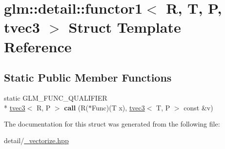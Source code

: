 \hypertarget{structglm_1_1detail_1_1functor1_3_01R_00_01T_00_01P_00_01tvec3_01_4}{\section{glm\-:\-:detail\-:\-:functor1$<$ R, T, P, tvec3 $>$ Struct Template Reference}
\label{structglm_1_1detail_1_1functor1_3_01R_00_01T_00_01P_00_01tvec3_01_4}
}
\subsection*{Static Public Member Functions}
\begin{DoxyCompactItemize}
\item 
\hypertarget{structglm_1_1detail_1_1functor1_3_01R_00_01T_00_01P_00_01tvec3_01_4_a8ae374d9111e3de3d32f18762f1918cc}{static G\-L\-M\-\_\-\-F\-U\-N\-C\-\_\-\-Q\-U\-A\-L\-I\-F\-I\-E\-R \\*
\hyperlink{structglm_1_1tvec3}{tvec3}$<$ R, P $>$ {\bfseries call} (R($\ast$Func)(T x), \hyperlink{structglm_1_1tvec3}{tvec3}$<$ T, P $>$ const \&v)}\label{structglm_1_1detail_1_1functor1_3_01R_00_01T_00_01P_00_01tvec3_01_4_a8ae374d9111e3de3d32f18762f1918cc}

\end{DoxyCompactItemize}


The documentation for this struct was generated from the following file\-:\begin{DoxyCompactItemize}
\item 
detail/\hyperlink{__vectorize_8hpp}{\-\_\-vectorize.\-hpp}\end{DoxyCompactItemize}
